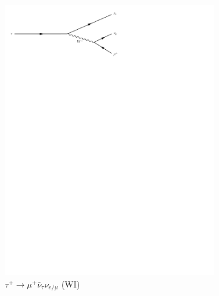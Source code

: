 \begin{figure}[h]
\begin{subfigure}[b]{0.3\textwidth}
    \includegraphics[trim={0.5cm 22cm 10cm 0cm},width=\textwidth]{../Diagrams/D5.pdf}
    \caption{$\tau^+\rightarrow \mu^+\bar{\nu}_{\tau}\nu_{e/\mu}$ (WI)}
    \label{fey:5}
  \end{subfigure}%
  ~
  \begin{subfigure}[b]{0.3\textwidth}

\end{subfigure}
\end{figure}
